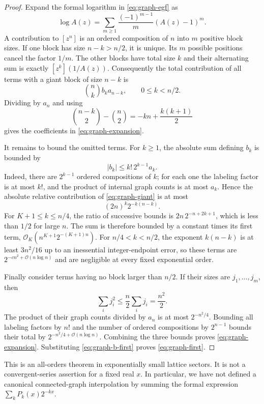 \documentclass[11pt,a4paper]{article}
\numberwithin{equation}{section}
\theoremstyle{definition}
\theoremstyle{remark}
\newcommand{\bigO}{\mathcal O}
\begin{document}
\begin{proof}
Expand the formal logarithm in \eqref{eq:graph-egf} as
\[
 \log A(z)=\sum_{m\ge1}\frac{(-1)^{m-1}}m(A(z)-1)^m.
\]
A contribution to $[z^n]$ is an ordered composition of $n$ into $m$ positive block sizes. If one block has size $n-k>n/2$, it is unique. Its $m$ possible positions cancel the factor $1/m$. The other blocks have total size $k$ and their alternating sum is exactly $[z^k](1/A(z))$. Consequently the total contribution of all terms with a giant block of size $n-k$ is
\begin{equation}
 \binom nk b_k a_{n-k},\qquad 0\le k<n/2.
 \label{eq:graph-giant}
\end{equation}
Dividing by $a_n$ and using
\[
 \binom{n-k}{2}-\binom n2=-kn+\frac{k(k+1)}2
\]
gives the coefficients in \eqref{eq:graph-expansion}.

It remains to bound the omitted terms. For $k\ge1$, the absolute sum defining $b_k$ is bounded by
\[
 |b_k|\le k!\,2^{k-1}a_k.
\]
Indeed, there are $2^{k-1}$ ordered compositions of $k$; for each one the labeling factor is at most $k!$, and the product of internal graph counts is at most $a_k$. Hence the absolute relative contribution of \eqref{eq:graph-giant} is at most
\begin{equation}
 (2n)^k2^{-k(n-k)}.
 \label{eq:graph-tail-bound}
\end{equation}
For $K+1\le k\le n/4$, the ratio of successive bounds is
$2n\,2^{-n+2k+1}$, which is less than $1/2$ for large $n$. The sum is therefore bounded by a constant times its first term,
$\bigO_K(n^{K+1}2^{-(K+1)n})$. For $n/4<k<n/2$, the exponent $k(n-k)$ is at least $3n^2/16$ up to an inessential integer-endpoint error, so these terms are $2^{-c n^2+\bigO(n\log n)}$ and are negligible at every fixed exponential order.

Finally consider terms having no block larger than $n/2$. If their sizes are $j_1,\ldots,j_m$, then
\[
 \sum_i j_i^2\le\frac n2\sum_i j_i=\frac{n^2}2.
\]
The product of their graph counts divided by $a_n$ is at most $2^{-n^2/4}$. Bounding all labeling factors by $n!$ and the number of ordered compositions by $2^{n-1}$ bounds their total by
$2^{-n^2/4+\bigO(n\log n)}$. Combining the three bounds proves \eqref{eq:graph-expansion}. Substituting \eqref{eq:graph-b-first} proves \eqref{eq:graph-first}.
\end{proof}

This is an all-orders theorem in exponentially small lattice sectors. It is not a convergent-series assertion for a fixed real $x$. In particular, we have not defined a canonical connected-graph interpolation by summing the formal expression $\sum_kP_k(x)2^{-kx}$.
\end{document}
